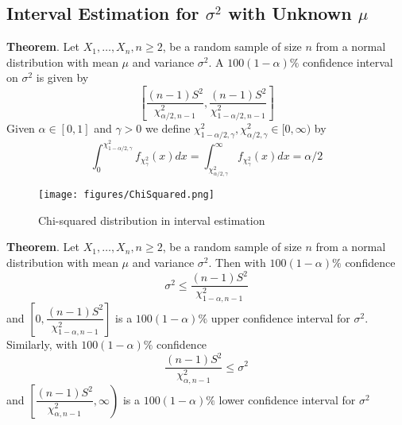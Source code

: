 \documentclass[a4paper,12pt]{article}
\begin{document}
\subsection{Interval Estimation for $\sigma^2$ with Unknown $\mu$ }
\textbf{Theorem}. Let $X_1, \ldots, X_n, n \geq 2$, be a random sample of size $n$ from a normal distribution with mean $\mu$ and variance $\sigma^2$. A $100(1-\alpha) \%$ confidence interval on $\sigma^2$ is given by
\begin{equation}
\left[\dfrac{(n-1) S^2}{ \chi_{\alpha / 2, n-1}^2},\dfrac{(n-1) S^2}{\chi_{1-\alpha / 2, n-1}^2} \right]
\end{equation}
Given $\alpha \in[0,1]$ and $\gamma>0$ we define $\chi_{1-\alpha / 2, \gamma}^2, \chi_{\alpha / 2, \gamma}^2 \in[0, \infty)$ by
\begin{equation}
\int_0^{\chi_{1-\alpha / 2, \gamma}^2} f_{\chi_\gamma^2}(x) d x=\int_{\chi_{\alpha / 2, \gamma}^2}^{\infty} f_{\chi_\gamma^2}(x) d x=\alpha / 2
\end{equation}
\begin{figure}[!h] 
    \centering
    \texttt{[image: figures/ChiSquared.png]} 
    \caption{Chi-squared distribution in interval estimation}
\end{figure}
\textbf{Theorem}. Let $X_1
, \ldots, X_n, n \geq 2$, be a random sample of size $n$ from a normal distribution with mean $\mu$ and variance $\sigma^2$. Then with $100(1-\alpha) \%$ confidence
$$
\sigma^2 \leq \dfrac{(n-1) S^2}{\chi_{1-\alpha, n-1}^2}
$$
and $\left[0, \dfrac{(n-1) S^2}{\chi_{1-\alpha, n-1}^2}\right]$ is a $100(1-\alpha) \%$ upper confidence interval for $\sigma^2$.
Similarly, with $100(1-\alpha) \%$ confidence
$$
\frac{(n-1) S^2}{\chi_{\alpha, n-1}^2} \leq \sigma^2
$$
and $\left[\dfrac{(n-1) S^2}{\chi_{\alpha, n-1}^2}, \infty\right)$ is a $100(1-\alpha) \%$ lower confidence interval for $\sigma^2$
\end{document}
